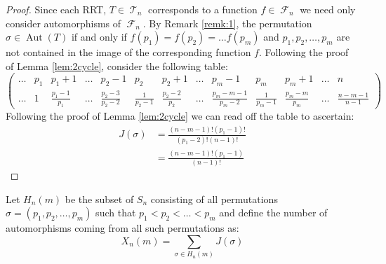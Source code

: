 \documentclass[oneside]{book} %
\theoremstyle{definition}
\numberwithin{equation}{section}
\DeclareMathOperator{\Aut}{Aut} %
\DeclareMathOperator{\T}{\mathcal{T}}
\DeclareMathOperator{\F}{\mathcal{F}}
\begin{document}
\begin{proof}
 Since each RRT, $T \in \T_n$ corresponds to a function $f\in \F_n$ we need only consider automorphisms of $\F_n$.  By Remark \ref{remk:1}, the permutation $\sigma \in \Aut(T)$ if and only if $f(p_1) = f(p_2) = \dots f(p_m)$ and $p_1,p_2,\dots,p_m$ are not contained in the image of the corresponding function $f$.  Following the proof of Lemma \ref{lem:2cycle}, consider the following table:
  \[
\label{eqn:tab}  \left(\begin{array}{ccccccccccccc}
       \dots & p_1 & p_1 +1            & \dots & p_2-1               & p_2              & p_2+1               & \dots & p_{m}-1                & p_m            &p_m+1 &\dots &   n\\
       \dots & 1   & \frac{p_1-1}{p_1} & \dots & \frac{p_2-3}{p_2-2} & \frac{1}{p_2 -1} & \frac{p_2 - 2}{p_2} & \dots & \frac{p_m - m-1}{p_m-2} & \frac{1}{p_m-1} & \frac{p_m-m}{p_m} &\dots  &  \frac{n-m-1}{n-1}
    \end{array} \right)
\]
Following the proof of Lemma \ref{lem:2cycle} we can read off the table to ascertain:
\begin{align}
 J(\sigma) &= \frac{(n-m-1)!(p_1-1)!}{(p_1-2)!(n-1)!}\\
 &= \frac{(n-m-1)!(p_1-1)}{(n-1)!}
\end{align}

 
\end{proof}


Let $H_n(m)$ be the subset of $S_n$ consisting of all permutations $\sigma = (p_1,p_2,\dots,p_m)$ such that $p_1 < p_2 <\dots < p_m$ and define the number of automorphisms coming from all such permutations as:
\[X_n(m) = \sum_ {\sigma \in H_n(m)}J(\sigma)\]
\end{document}
